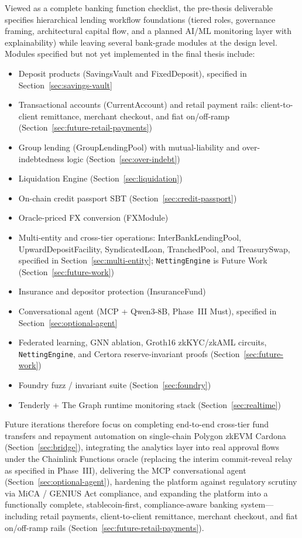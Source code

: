 \documentclass[12pt,a4paper]{report}
\begin{document}
Viewed as a complete banking function checklist, the pre-thesis deliverable specifies hierarchical lending workflow foundations (tiered roles, governance framing, architectural capital flow, and a planned AI/ML monitoring layer with explainability) while leaving several bank-grade modules at the design level. Modules specified but not yet implemented in the final thesis include:
\begin{itemize}[noitemsep]
\item Deposit products (SavingsVault and FixedDeposit), specified in Section~\ref{sec:savings-vault}
\item Transactional accounts (CurrentAccount) and retail payment rails: client-to-client remittance, merchant checkout, and fiat on/off-ramp (Section~\ref{sec:future-retail-payments})
\item Group lending (GroupLendingPool) with mutual-liability and over-indebtedness logic (Section~\ref{sec:over-indebt})
\item Liquidation Engine (Section~\ref{sec:liquidation})
\item On-chain credit passport SBT (Section~\ref{sec:credit-passport})
\item Oracle-priced FX conversion (FXModule)
\item Multi-entity and cross-tier operations: InterBankLendingPool, UpwardDepositFacility, SyndicatedLoan, TranchedPool, and TreasurySwap, specified in Section~\ref{sec:multi-entity}; \texttt{NettingEngine} is Future Work (Section~\ref{sec:future-work})
\item Insurance and depositor protection (InsuranceFund)
\item Conversational agent (MCP + Qwen3-8B, Phase~III Must), specified in Section~\ref{sec:optional-agent}
\item Federated learning, GNN ablation, Groth16 zkKYC/zkAML circuits, \texttt{NettingEngine}, and Certora reserve-invariant proofs (Section~\ref{sec:future-work})
\item Foundry fuzz / invariant suite (Section~\ref{sec:foundry})
\item Tenderly + The Graph runtime monitoring stack (Section~\ref{sec:realtime})
\end{itemize}
Future iterations therefore focus on completing end-to-end cross-tier fund transfers and repayment automation on single-chain Polygon zkEVM Cardona (Section~\ref{sec:bridge}), integrating the analytics layer into real approval flows under the Chainlink Functions oracle (replacing the interim commit-reveal relay as specified in Phase~III), delivering the MCP conversational agent (Section~\ref{sec:optional-agent}), hardening the platform against regulatory scrutiny via MiCA / GENIUS Act compliance, and expanding the platform into a functionally complete, stablecoin-first, compliance-aware banking system---including retail payments, client-to-client remittance, merchant checkout, and fiat on/off-ramp rails (Section~\ref{sec:future-retail-payments}).
\end{document}
